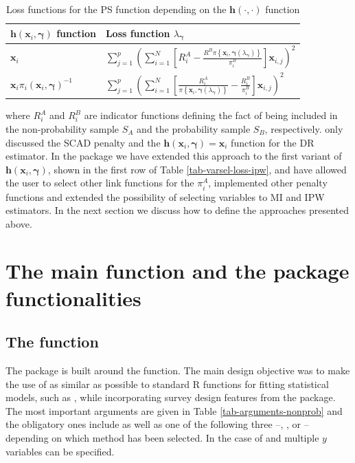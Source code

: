 \documentclass[
]{jss}
\begin{document}
\begin{table}[ht!]
\centering
\begin{tabular}{ll}
\hline
$\boldsymbol{h}(\boldsymbol{x}_i, \boldsymbol{\gamma})$ function &  Loss function $\lambda_{\boldsymbol{\gamma}}$ \\
\hline
$\boldsymbol{x}_i$ & $\sum_{j=1}^p\left(\sum_{i=1}^N\left[R_i^A - \frac{R^B\pi\left\{\boldsymbol{x}_i, \boldsymbol{\gamma}(\lambda_{\boldsymbol{\gamma}})\right\}}{\pi_i^B}\right] \boldsymbol{x}_{i, j}\right)^2$\\
\hline
$\boldsymbol{x}_i \pi_i(\boldsymbol{x}_i, \boldsymbol{\gamma})^{-1}$ & $\sum_{j=1}^p\left(\sum_{i=1}^N\left[\frac{R_i^A}{\pi\left\{\boldsymbol{x}_i, \boldsymbol{\gamma}(\lambda_{\boldsymbol{\gamma}})\right\}}-\frac{R_i^B}{\pi_i^B}\right] \boldsymbol{x}_{i, j}\right)^2$ \\
\hline
\end{tabular}
\caption{Loss functions for the PS function depending on the $\boldsymbol{h}(\cdot,\cdot)$ function}
\label{tab-varsel-loss-ipw}
\end{table}

where \(R_i^A\) and \(R_i^B\) are indicator functions defining the fact
of being included in the non-probability sample \(S_A\) and the
probability sample \(S_B\), respectively. \citet{yang_doubly_2020} only
discussed the SCAD penalty and the
\(\boldsymbol{h}(\boldsymbol{x}_i, \boldsymbol{\gamma})=\boldsymbol{x}_i\)
function for the DR estimator. In the  package we have
extended this approach to the first variant of
\(\boldsymbol{h}(\boldsymbol{x}_i, \boldsymbol{\gamma})\), shown in the
first row of Table \eqref{tab-varsel-loss-ipw}, and have allowed the
user to select other link functions for the \(\pi_i^A\), implemented
other penalty functions and extended the possibility of selecting
variables to MI and IPW estimators. In the next section we discuss how
to define the approaches presented above.

\section{The main function and the package
functionalities}\label{sec-package}

\subsection[The nonprob function]{The  function}

The  package is built around the 
function. The main design objective was to make the use of
 as similar as possible to standard R functions for
fitting statistical models, such as , while
incorporating survey design features from the  package. The
most important arguments are given in Table \ref{tab-arguments-nonprob}
and the obligatory ones include  as well as one of the
following three --, , or  --
depending on which method has been selected. In the case of
 and  multiple \(y\) variables can be
specified.
\end{document}
